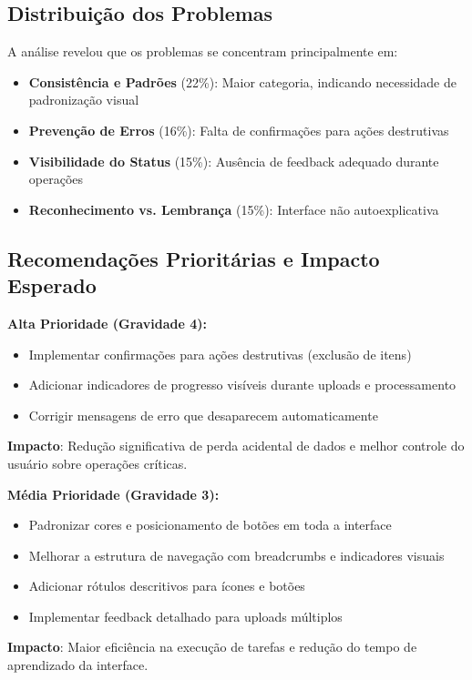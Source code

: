 \subsection{Distribuição dos Problemas}

A análise revelou que os problemas se concentram principalmente em:
\begin{itemize}
    \item \textbf{Consistência e Padrões} (22\%): Maior categoria, indicando necessidade de padronização visual
    \item \textbf{Prevenção de Erros} (16\%): Falta de confirmações para ações destrutivas
    \item \textbf{Visibilidade do Status} (15\%): Ausência de feedback adequado durante operações
    \item \textbf{Reconhecimento vs. Lembrança} (15\%): Interface não autoexplicativa
\end{itemize}

\subsection{Recomendações Prioritárias e Impacto Esperado}

\textbf{Alta Prioridade (Gravidade 4):}
\begin{itemize}
    \item Implementar confirmações para ações destrutivas (exclusão de itens)
    \item Adicionar indicadores de progresso visíveis durante uploads e processamento
    \item Corrigir mensagens de erro que desaparecem automaticamente
\end{itemize}
\textbf{Impacto}: Redução significativa de perda acidental de dados e melhor controle do usuário sobre operações críticas.

\textbf{Média Prioridade (Gravidade 3):}
\begin{itemize}
    \item Padronizar cores e posicionamento de botões em toda a interface
    \item Melhorar a estrutura de navegação com breadcrumbs e indicadores visuais
    \item Adicionar rótulos descritivos para ícones e botões
    \item Implementar feedback detalhado para uploads múltiplos
\end{itemize}
\textbf{Impacto}: Maior eficiência na execução de tarefas e redução do tempo de aprendizado da interface.

